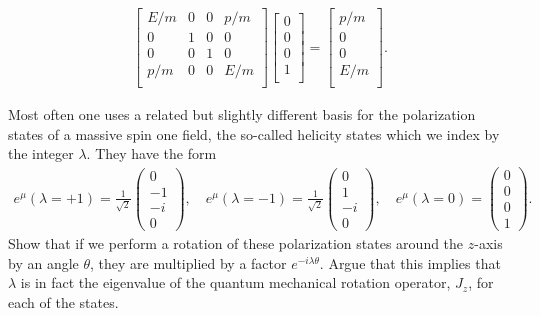 \documentclass[working, oneside]{../../../Preambles/tuftebook}
\begin{document}
\begin{solution}
\begin{align*}
\begin{bmatrix}
    E /m & 0 & 0 & p /m \\
    0 & 1 & 0 & 0 \\
    0 & 0 & 1 & 0 \\
    p /m & 0 & 0& E /m \\
\end{bmatrix}
\begin{bmatrix}
    0 \\
    0 \\
    0 \\
    1 \\
\end{bmatrix} =
\begin{bmatrix}
    p /m \\
    0 \\
    0 \\
    E /m \\
\end{bmatrix}
.\end{align*}
\end{solution}
\begin{exercise}[4]
Most often one uses a related but slightly different basis for 
the polarization states of a massive spin one field, the so-called helicity 
states which we index by the integer $\lambda$. They have the form
\begin{align}
e^\mu(\lambda=+1)=\frac{1}{\sqrt{2}}\left(\begin{matrix}0\\-1\\-i\\0\end{matrix}\right),\quad
e^\mu(\lambda=-1)=\frac{1}{\sqrt{2}}\left(\begin{matrix}0\\1\\-i\\0\end{matrix}\right),\quad
e^\mu(\lambda=0)=\left(\begin{matrix}0\\0\\0\\1\end{matrix}\right).
\end{align}
Show that if we perform a rotation of these polarization states around the $z$-axis
by an angle $\theta$, they are multiplied by a factor $e^{-i\lambda\theta}$. Argue that 
this implies that $\lambda$ is in fact the eigenvalue of the quantum mechanical 
rotation operator, $J_z$, for each of the states. 
\end{exercise}
\end{document}
